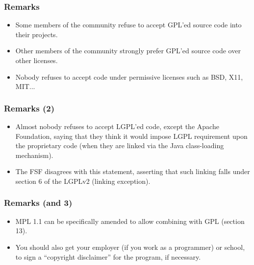 
\begin{frame}
\frametitle{Remarks}

\begin{itemize}
\item Some members of the community refuse to accept GPL'ed source code into their projects.
\item Other members of the community strongly prefer GPL'ed source code over other licenses.
\item Nobody refuses to accept code under permissive licenses such as BSD, X11, MIT... 
\end{itemize}

\end{frame}


\begin{frame}
\frametitle{Remarks (2)}

\begin{itemize}
\item Almost nobody refuses to accept LGPL'ed code, except the Apache Foundation, saying that they think it would impose LGPL requirement upon the proprietary code (when they are linked via the Java class-loading mechanism).
\item The FSF disagrees with this statement, asserting that such linking falls under section 6 of the LGPLv2 (linking exception).
\end{itemize}

\end{frame}


\begin{frame}
\frametitle{Remarks (and 3)}

\begin{itemize}
\item MPL 1.1 can be specifically amended to allow combining with GPL (section 13).
\item You should also get your employer (if you work as a programmer) or school, to sign a ``copyright disclaimer'' for the program, if necessary. 
\end{itemize}

\end{frame}



